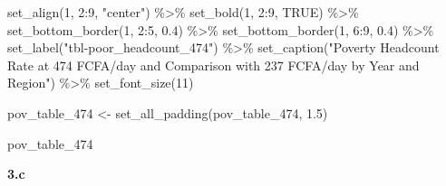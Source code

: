 \documentclass[
  letterpaper,
  DIV=11,
  numbers=noendperiod]{scrartcl}
\newenvironment{Shaded}{\begin{snugshade}}{\end{snugshade}}
\newcommand{\ConstantTok}[1]{\textcolor[rgb]{0.56,0.35,0.01}{#1}}
\newcommand{\DecValTok}[1]{\textcolor[rgb]{0.68,0.00,0.00}{#1}}
\newcommand{\FloatTok}[1]{\textcolor[rgb]{0.68,0.00,0.00}{#1}}
\newcommand{\FunctionTok}[1]{\textcolor[rgb]{0.28,0.35,0.67}{#1}}
\newcommand{\NormalTok}[1]{\textcolor[rgb]{0.00,0.23,0.31}{#1}}
\newcommand{\OtherTok}[1]{\textcolor[rgb]{0.00,0.23,0.31}{#1}}
\newcommand{\SpecialCharTok}[1]{\textcolor[rgb]{0.37,0.37,0.37}{#1}}
\newcommand{\StringTok}[1]{\textcolor[rgb]{0.13,0.47,0.30}{#1}}
\begin{document}
\begin{Shaded}
\begin{Highlighting}[]
  \FunctionTok{set\_align}\NormalTok{(}\DecValTok{1}\NormalTok{, }\DecValTok{2}\SpecialCharTok{:}\DecValTok{9}\NormalTok{, }\StringTok{"center"}\NormalTok{) }\SpecialCharTok{\%\textgreater{}\%}
  \FunctionTok{set\_bold}\NormalTok{(}\DecValTok{1}\NormalTok{, }\DecValTok{2}\SpecialCharTok{:}\DecValTok{9}\NormalTok{, }\ConstantTok{TRUE}\NormalTok{) }\SpecialCharTok{\%\textgreater{}\%}
  \FunctionTok{set\_bottom\_border}\NormalTok{(}\DecValTok{1}\NormalTok{, }\DecValTok{2}\SpecialCharTok{:}\DecValTok{5}\NormalTok{, }\FloatTok{0.4}\NormalTok{) }\SpecialCharTok{\%\textgreater{}\%}
  \FunctionTok{set\_bottom\_border}\NormalTok{(}\DecValTok{1}\NormalTok{, }\DecValTok{6}\SpecialCharTok{:}\DecValTok{9}\NormalTok{, }\FloatTok{0.4}\NormalTok{) }\SpecialCharTok{\%\textgreater{}\%}
  \FunctionTok{set\_label}\NormalTok{(}\StringTok{"tbl{-}poor\_headcount\_474"}\NormalTok{) }\SpecialCharTok{\%\textgreater{}\%}
  \FunctionTok{set\_caption}\NormalTok{(}\StringTok{"Poverty Headcount Rate at 474 FCFA/day and Comparison with 237 FCFA/day by Year and Region"}\NormalTok{) }\SpecialCharTok{\%\textgreater{}\%}
  \FunctionTok{set\_font\_size}\NormalTok{(}\DecValTok{11}\NormalTok{)}

\NormalTok{pov\_table\_474 }\OtherTok{\textless{}{-}} \FunctionTok{set\_all\_padding}\NormalTok{(pov\_table\_474, }\FloatTok{1.5}\NormalTok{)}

\NormalTok{pov\_table\_474}
\end{Highlighting}
\end{Shaded}

\textbf{3.c}
\end{document}
